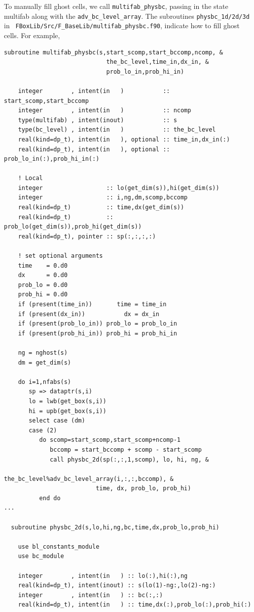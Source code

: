 To manually fill ghost cells, we call {\tt multifab\_physbc}, passing
in the state multifab along with the {\tt adv\_bc\_level\_array}.  The
subroutines {\tt physbc\_1d/2d/3d} in {\tt
  FBoxLib/Src/F\_BaseLib/multifab\_physbc.f90}, indicate how to fill
ghost cells.  For example,
\begin{lstlisting}[backgroundcolor=\color{light-green}]
  subroutine multifab_physbc(s,start_scomp,start_bccomp,ncomp, &
                             the_bc_level,time_in,dx_in, &
                             prob_lo_in,prob_hi_in)

    integer        , intent(in   )           :: start_scomp,start_bccomp
    integer        , intent(in   )           :: ncomp
    type(multifab) , intent(inout)           :: s
    type(bc_level) , intent(in   )           :: the_bc_level
    real(kind=dp_t), intent(in   ), optional :: time_in,dx_in(:)
    real(kind=dp_t), intent(in   ), optional :: prob_lo_in(:),prob_hi_in(:)

    ! Local
    integer                  :: lo(get_dim(s)),hi(get_dim(s))
    integer                  :: i,ng,dm,scomp,bccomp
    real(kind=dp_t)          :: time,dx(get_dim(s))
    real(kind=dp_t)          :: prob_lo(get_dim(s)),prob_hi(get_dim(s))
    real(kind=dp_t), pointer :: sp(:,:,:,:)
    
    ! set optional arguments
    time    = 0.d0
    dx      = 0.d0
    prob_lo = 0.d0
    prob_hi = 0.d0
    if (present(time_in))       time = time_in
    if (present(dx_in))           dx = dx_in
    if (present(prob_lo_in)) prob_lo = prob_lo_in
    if (present(prob_hi_in)) prob_hi = prob_hi_in

    ng = nghost(s)
    dm = get_dim(s)
    
    do i=1,nfabs(s)
       sp => dataptr(s,i)
       lo = lwb(get_box(s,i))
       hi = upb(get_box(s,i))
       select case (dm)
       case (2)
          do scomp=start_scomp,start_scomp+ncomp-1
             bccomp = start_bccomp + scomp - start_scomp
             call physbc_2d(sp(:,:,1,scomp), lo, hi, ng, &
                          the_bc_level%adv_bc_level_array(i,:,:,bccomp), &
                          time, dx, prob_lo, prob_hi)
          end do
...

  subroutine physbc_2d(s,lo,hi,ng,bc,time,dx,prob_lo,prob_hi)

    use bl_constants_module
    use bc_module

    integer        , intent(in   ) :: lo(:),hi(:),ng
    real(kind=dp_t), intent(inout) :: s(lo(1)-ng:,lo(2)-ng:)
    integer        , intent(in   ) :: bc(:,:)
    real(kind=dp_t), intent(in   ) :: time,dx(:),prob_lo(:),prob_hi(:)


\end{lstlisting}
